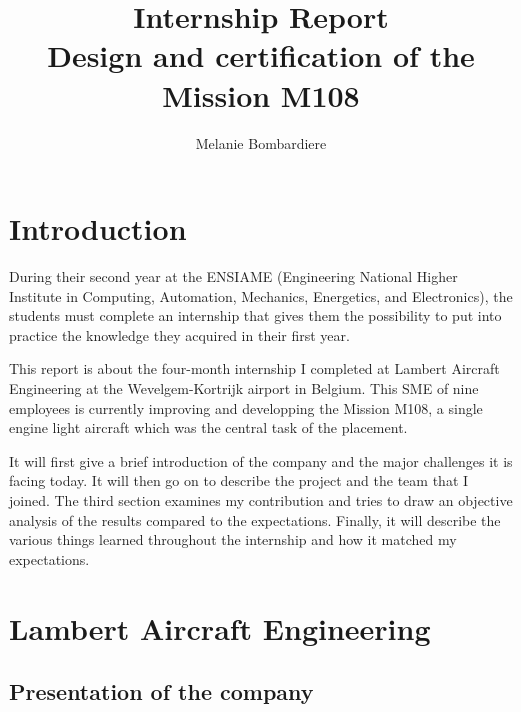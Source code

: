\documentclass[11pt,a4paper]{report}
\begin{document}
\title{\textbf{Internship Report\\Design and certification of the Mission M108}}

\author{Melanie Bombardiere}

\maketitle

\pagestyle{fancy}
\fancyhead{}

\newpage

\tableofcontents

\newpage

\section{Introduction}

During their second year at the ENSIAME (Engineering National Higher Institute in Computing, Automation, Mechanics, Energetics, and Electronics), the students must complete an internship that gives them the possibility to put into practice the knowledge they acquired in their first year.

\bigskip

This report is about the four-month internship I completed at Lambert Aircraft Engineering at the Wevelgem-Kortrijk airport in Belgium. This SME of nine employees is currently improving and developping the Mission M108, a single engine light aircraft which was the central task of the placement.

\bigskip

It will first give a brief introduction of the company and the major challenges it is facing today. It will then go on to describe the project and the team that I joined. The third section examines my contribution and tries to draw an objective analysis of the results compared to the expectations. Finally, it will describe the various things learned throughout the internship and how it matched my expectations.

\newpage

\section{Lambert Aircraft Engineering}

\subsection{Presentation of the company}
\end{document}
